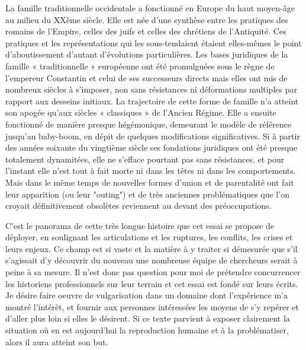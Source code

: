 La famille traditionnelle occidentale a fonctionné en Europe du haut moyen-âge au milieu du XXème siècle. Elle est née d'une synthèse entre les pratiques des romains de l'Empire, celles des juifs et celles des chrétiens de l'Antiquité. Ces pratiques et les représentations qui les sous-tendaient étaient elles-mêmes le point d'aboutissement d'autant d'évolutions particulières. Les bases juridiques de la famille « traditionnelle » européenne ont été promulguées sous le règne de l'empereur Constantin et celui de ses successeurs directs mais elles ont mis de nombreux siècles à s'imposer, non sans résistances ni déformations multiples par rapport aux desseins initiaux. La trajectoire de cette forme de famille n'a atteint son apogée qu'aux siècles « classiques » de l'Ancien Régime. Elle a ensuite fonctionné de manière presque hégémonique, demeurant le modèle de référence jusqu'au baby-boom, en dépit de quelques modifications significatives. Si à partir des années soixante du vingtième siècle ses fondations juridiques ont été presque totalement dynamitées, elle ne s'efface pourtant pas sans résistances, et pour l'instant elle n'est tout à fait morte ni dans les têtes ni dans les comportements. Mais dans le même temps de nouvelles formes d'union et de parentalité ont fait leur apparition (ou leur "outing") et de très anciennes problématiques que l'on croyait définitivement obsolètes reviennent au devant des préoccupations. 



C'est le panorama de cette très longue histoire que cet essai se propose de déployer, en soulignant les articulations et les ruptures, les conflits, les crises et leurs enjeux. Ce champ est si vaste et la matière à y traiter  si démesurée que s'il s'agissait d'y découvrir du nouveau une nombreuse équipe de chercheurs serait à peine à sa mesure. Il n'est donc pas question pour moi de prétendre concurrencer les historiens professionnels sur leur terrain et cet essai est fondé sur leurs écrits. Je désire faire oeuvre de vulgarisation dans un domaine dont l'expérience m'a montré l'intérêt, et fournir aux personnes intéressées les moyens de s'y repérer et d'aller plus loin si elles le désirent. Si ce texte parvient à exposer clairement la situation où en est aujourd'hui la reproduction humaine et à la problématiser, alors il aura atteint son but. 

